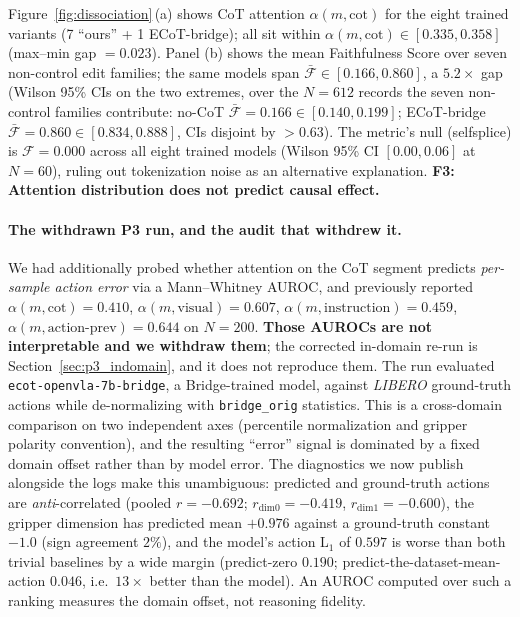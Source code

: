 \documentclass{article}
\begin{document}
Figure~\ref{fig:dissociation}\,(a) shows CoT attention $\alpha(m, \text{cot})$ for the eight trained variants (7 ``ours'' + 1 ECoT-bridge); all sit within $\alpha(m, \text{cot}) \in [0.335, 0.358]$ (max--min gap $=0.023$). Panel (b) shows the mean Faithfulness Score over seven non-control edit families; the same models span $\bar{\mathcal{F}}\in[0.166, 0.860]$, a $5.2\times$ gap (Wilson 95\% CIs on the two extremes, over the $N{=}612$ records the seven non-control families contribute: no-CoT $\bar{\mathcal{F}}{=}0.166 \in [0.140, 0.199]$; ECoT-bridge $\bar{\mathcal{F}}{=}0.860 \in [0.834, 0.888]$, CIs disjoint by $>0.63$). The metric's null (selfsplice) is $\mathcal{F}\!=\!0.000$ across all eight trained models (Wilson 95\% CI $[0.00, 0.06]$ at $N{=}60$), ruling out tokenization noise as an alternative explanation. \textbf{F3: Attention distribution does not predict causal effect.}

\paragraph{The withdrawn P3 run, and the audit that withdrew it.} We had additionally probed whether attention on the CoT segment predicts \emph{per-sample action error} via a Mann--Whitney AUROC, and previously reported $\alpha(m,\text{cot}){=}0.410$, $\alpha(m,\text{visual}){=}0.607$, $\alpha(m,\text{instruction}){=}0.459$, $\alpha(m,\text{action-prev}){=}0.644$ on $N{=}200$. \textbf{Those AUROCs are not interpretable and we withdraw them}; the corrected in-domain re-run is Section~\ref{sec:p3_indomain}, and it does not reproduce them. The run evaluated \texttt{ecot-openvla-7b-bridge}, a Bridge-trained model, against \emph{LIBERO} ground-truth actions while de-normalizing with \texttt{bridge\_orig} statistics. This is a cross-domain comparison on two independent axes (percentile normalization and gripper polarity convention), and the resulting ``error'' signal is dominated by a fixed domain offset rather than by model error. The diagnostics we now publish alongside the logs make this unambiguous: predicted and ground-truth actions are \emph{anti}-correlated (pooled $r{=}-0.692$; $r_{\text{dim}0}{=}-0.419$, $r_{\text{dim}1}{=}-0.600$), the gripper dimension has predicted mean $+0.976$ against a ground-truth constant $-1.0$ (sign agreement $2\%$), and the model's action L$_1$ of $0.597$ is worse than both trivial baselines by a wide margin (predict-zero $0.190$; predict-the-dataset-mean-action $0.046$, i.e.\ $13\times$ better than the model). An AUROC computed over such a ranking measures the domain offset, not reasoning fidelity.
\end{document}
